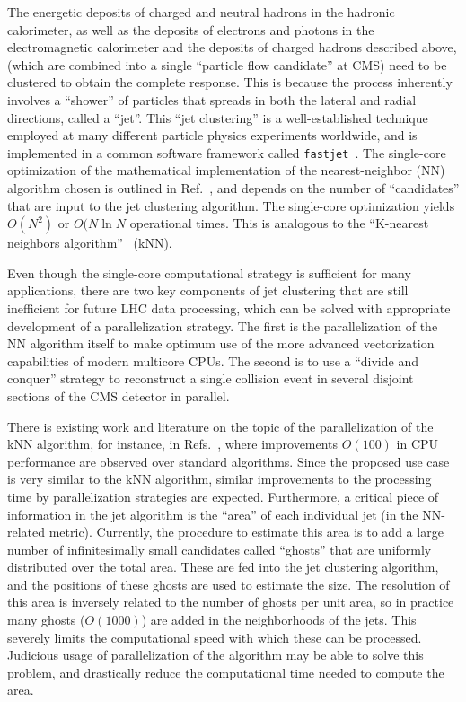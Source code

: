 \documentclass[12pt]{article}
\begin{document}
The energetic deposits of charged and neutral hadrons in the hadronic
calorimeter, as well as the deposits of electrons and photons in the
electromagnetic calorimeter and the deposits of charged hadrons
described above, (which are combined into a single ``particle flow
candidate'' at CMS) need to be clustered to obtain the complete
response. This is because the process inherently involves a ``shower''
of particles that spreads in both the lateral and radial directions,
called a ``jet''. This ``jet clustering'' is a well-established
technique employed at
many different particle physics experiments worldwide, and is
implemented in a common software framework called 
{\tt fastjet}~\cite{fastjet_manual}. The single-core optimization of
the mathematical implementation of the nearest-neighbor (NN) algorithm
chosen is outlined in Ref.~\cite{fastjet_timing}, and depends on the
number of ``candidates'' that are input to the jet clustering
algorithm. The single-core optimization yields $O(N^2)$ or 
$O(N \ln{N}$ operational times. This is analogous to the
``K-nearest neighbors algorithm''~\cite{knn_ieee} (kNN). 

Even though the single-core computational strategy is
sufficient for many applications, there are two key components of 
jet clustering that are still inefficient for future LHC data
processing, which can be solved with appropriate development of a
parallelization strategy. The first is the
parallelization of the NN algorithm itself to make
optimum use of the more advanced vectorization capabilities of modern
multicore CPUs. The second is to use a ``divide and conquer'' strategy
to reconstruct a single collision event in several disjoint sections of
the CMS detector in parallel. 

There is existing work and literature on the topic of the
parallelization of the kNN algorithm, for instance, in
Refs.~\cite{knn_gpu_1, knn_gpu_2, knn_gpu_3}, where improvements
$O(100)$ in CPU performance are observed over standard
algorithms. Since the proposed use case is
very similar to the kNN algorithm, similar improvements to the
processing time by parallelization strategies are expected. 
Furthermore, 
a critical piece of information in the jet algorithm
is the ``area'' of each individual jet (in the NN-related
metric). Currently, the procedure to estimate this area is to add a
large number of infinitesimally small candidates called ``ghosts''
that are uniformly distributed over the total area. These are fed into
the jet clustering algorithm, and the positions of these ghosts are
used to estimate the size. The resolution of this area is inversely
related to the number of ghosts per unit area, so in practice many
ghosts ($O(1000)$) are added in the neighborhoods of the jets. 
This severely limits the computational speed with which these can be
processed. Judicious usage of parallelization of the algorithm may be
able to solve this problem, and drastically reduce the computational
time needed to compute the area. 
\end{document}
